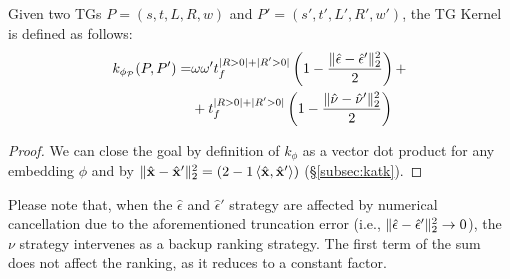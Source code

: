 \begin{proposition}\label{lem:rewritinglemma}
Given two TGs $P=(s,t,L,R,w)$ and $P'=(s',t',L',R',w')$, the TG Kernel is defined as follows:
$$\begin{aligned}
k_{\phi_{\mathcal{P}}}(P,P')=&\omega\omega't_f^{|R>0|+|R'>0|}\left(1-\frac{\|\hat{\epsilon}-\hat{\epsilon}'\|_{2}^2}{2}\right)+\\
	&+t_f^{|R>0|+|R'>0|}\left(1-\frac{\|\hat{\nu}-\hat{\nu}'\|_{2}^2}{2}\right)\\
\end{aligned}$$
\end{proposition}
\begin{proof} We can close the goal by definition of $k_{\phi}$ as a vector dot product for any embedding $\phi$ and by  $\|\hat{\mathbf{x}}-\hat{\mathbf{x}}'\|_2^2=(2-1\braket{\hat{\mathbf{x}},\hat{\mathbf{x}}'})$ (\S\ref{subsec:katk}).	
%	
\end{proof}

Please note that, when the $\hat{\epsilon}$ and $\hat{\epsilon}'$ strategy are affected by numerical cancellation due to the aforementioned truncation error (i.e., $\|\hat{\epsilon}-\hat{\epsilon}'\|_{2}^2\to 0$), the $\nu$ strategy intervenes as a backup ranking strategy. The first term of the sum does not affect the ranking, as it reduces to a constant factor.

